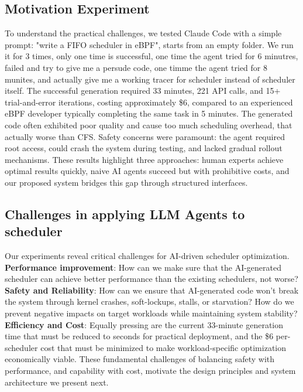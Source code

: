 \subsection{Motivation Experiment}

To understand the practical challenges, we tested Claude Code with a simple prompt: "write a FIFO scheduler in eBPF", starts from an empty folder. We run it for 3 times, only one time is successful, one time the agent tried for 6 minutres, failed and try to give me a persude code, one timme the agent tried for 8 munites, and actually give me a working tracer for scheduler instead of scheduler itself. The successful generation required 33 minutes, 221 API calls, and 15+ trial-and-error iterations, costing approximately \$6, compared to an experienced eBPF developer typically completing the same task in 5 minutes. The generated code often exhibited poor quality and cause too much scheduling overhead, that actually worse than CFS. Safety concerns were paramount: the agent required root access, could crash the system during testing, and lacked gradual rollout mechanisms. These results highlight three approaches: human experts achieve optimal results quickly, naive AI agents succeed but with prohibitive costs, and our proposed system bridges this gap through structured interfaces.

\subsection{Challenges in applying LLM Agents to scheduler}

Our experiments reveal critical challenges for AI-driven scheduler optimization. \textbf{Performance improvement}: How can we make sure that the AI-generated scheduler can achieve better performance than the existing schedulers, not worse? \textbf{Safety and Reliability}: How can we ensure that AI-generated code won't break the system through kernel crashes, soft-lockups, stalls, or starvation? How do we prevent negative impacts on target workloads while maintaining system stability? \textbf{Efficiency and Cost}: Equally pressing are the current 33-minute generation time that must be reduced to seconds for practical deployment, and the \$6 per-scheduler cost that must be minimized to make workload-specific optimization economically viable. These fundamental challenges of balancing safety with performance, and capability with cost, motivate the design principles and system architecture we present next.